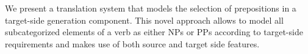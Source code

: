 We present a translation system that models the selection of prepositions in a target-side generation component. This novel approach allows to model all subcategorized elements of a verb as either NPs or PPs according to target-side requirements and makes use of both source and target side features.
